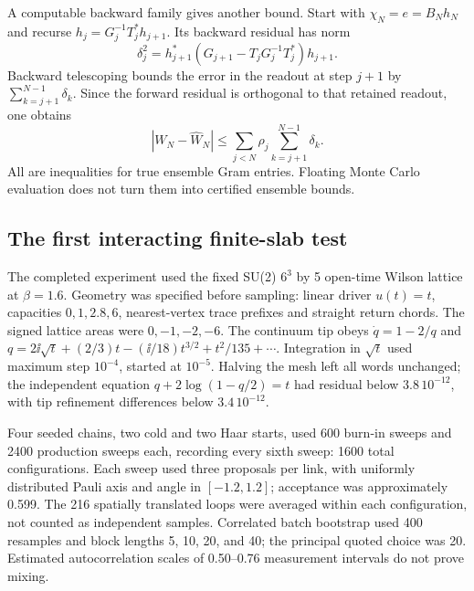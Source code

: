 A computable backward family gives another bound. Start
with $\chi_N=e=B_Nh_N$ and recurse
$h_j=G_j^{-1}T_j^*h_{j+1}$. Its backward residual has norm
\begin{equation}
\delta_j^2=h_{j+1}^*(G_{j+1}-T_jG_j^{-1}T_j^*)h_{j+1}.
\end{equation}
Backward telescoping bounds the error in the readout at
step $j+1$ by $\sum_{k=j+1}^{N-1}\delta_k$.
Since the forward residual is orthogonal to that retained
readout, one obtains
\begin{equation}\label{eq:fb-bound}
|W_N-\widehat W_N|
\le\sum_{j<N}\rho_j\sum_{k=j+1}^{N-1}\delta_k .
\end{equation}
All are inequalities for true ensemble Gram entries.
Floating Monte Carlo evaluation does not turn them into
certified ensemble bounds.

\subsection{The first interacting finite-slab test}
The completed experiment used the fixed SU(2) $6^3$ by
5 open-time Wilson lattice at $\beta=1.6$. Geometry was
specified before sampling: linear driver $u(t)=t$,
capacities $0,1,2.8,6$, nearest-vertex trace prefixes and
straight return chords. The signed lattice areas were
$0,-1,-2,-6$. The continuum tip obeys
$\dot q=1-2/q$ and
$q=2\ii\sqrt t+(2/3)t-(\ii/18)t^{3/2}+t^2/135+\cdots$.
Integration in $\sqrt t$ used maximum step $10^{-4}$,
started at $10^{-5}$. Halving the mesh left all words
unchanged; the independent equation
$q+2\log(1-q/2)=t$ had residual below $3.8\,10^{-12}$,
with tip refinement differences below $3.4\,10^{-12}$.

Four seeded chains, two cold and two Haar starts, used
600 burn-in sweeps and 2400 production sweeps each,
recording every sixth sweep: 1600 total configurations.
Each sweep used three proposals per link, with uniformly
distributed Pauli axis and angle in $[-1.2,1.2]$;
acceptance was approximately 0.599. The 216 spatially
translated loops were averaged within each configuration,
not counted as independent samples. Correlated batch
bootstrap used 400 resamples and block lengths 5, 10,
20, and 40; the principal quoted choice was 20.
Estimated autocorrelation scales of 0.50--0.76 measurement
intervals do not prove mixing.

